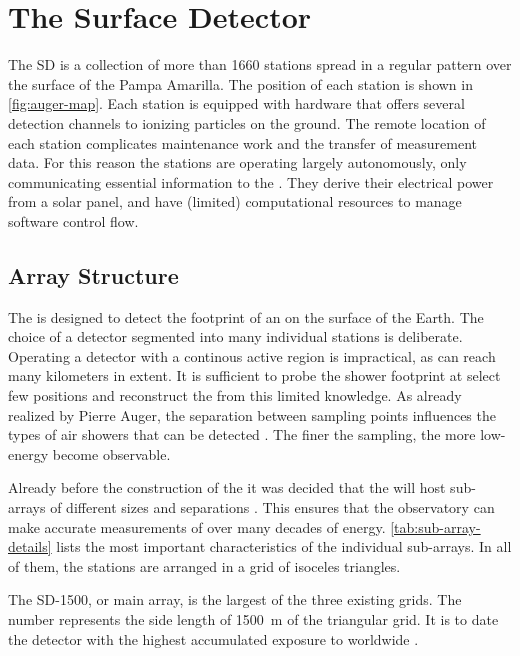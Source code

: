 \section{The Surface Detector}
\label{sec:sd}

The \acf{SD} is a collection of more than 1660 stations spread in a regular 
pattern over the surface of the Pampa Amarilla. The position of each station is
shown in \cref{fig:auger-map}. Each station is equipped with hardware that 
offers several detection channels to ionizing particles on the ground. The
remote location of each station complicates maintenance work and the transfer 
of measurement data. For this reason the stations are operating largely 
autonomously, only communicating essential information to the \CDAS. They 
derive their electrical power from a solar panel, and have (limited) 
computational resources to manage software control flow.  

\subsection{Array Structure}
\label{ssec:array-structure}

The \SD is designed to detect the footprint of an \EAS on the surface of the 
Earth. The choice of a detector segmented into many individual stations is
deliberate. Operating a detector with a continous active region is impractical,
as \EASs can reach many kilometers in extent. It is sufficient to probe the 
shower footprint at select few positions and reconstruct the \EAS from this 
limited knowledge. As already realized by Pierre Auger, the separation between 
sampling points influences the types of air showers that can be detected 
\cite{augerExtensiveCosmicRayShowers1939}. The finer the sampling, the more 
low-energy \EAS become observable.

Already before the construction of the \PAO it was decided that the \SD will 
host sub-arrays of different sizes and separations 
\cite{watsonDevelopmentPierreAuger}. This ensures that the observatory can 
make accurate measurements of \EAS over many decades of energy. 
\cref{tab:sub-array-details} lists the most important characteristics of the 
individual sub-arrays. In all of them, the stations are arranged in a grid of 
isoceles triangles. 

The SD-1500, or main array, is the largest of the three existing grids. The 
number represents the side length of \SI{1500}{\meter} of the triangular grid.
It is to date the detector with the highest accumulated exposure to \CRs 
worldwide \cite{aabPierreAugerObservatory2020}.

